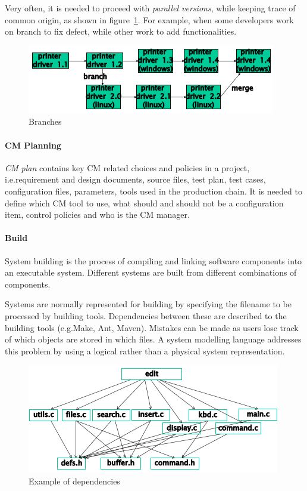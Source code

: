 Very often, it is needed to proceed with \emph{parallel versions}, while keeping trace of common origin, as shown in figure~\ref{img:branches_merges}. For example, when some developers work on branch to fix defect, while other work to add functionalities.

\begin{figure}[hbtp]
\centering
\includegraphics[scale=0.5]{images/branches_merges.png}
\caption{Branches}
\label{img:branches_merges}
\end{figure}

\paragraph{CM Planning}
\emph{CM plan} contains key CM related choices and policies in a project, i.e.\@ requirement and design documents, source files, test plan, test cases, configuration files, parameters, tools used in the production chain. It is needed to define which CM tool to use, what should and should not be a configuration item, control policies and who is the CM manager.

\paragraph{Build}
System building is the process of compiling and linking software components into an executable system. Different systems are built from different combinations of components.

Systems are normally represented for building by specifying the filename to be processed by building tools. Dependencies between these are described to the building tools (e.g.\@ Make, Ant, Maven). Mistakes can be made as users lose track of which objects are stored in which files. A system modelling language addresses this problem by using a logical rather than a physical system representation.

\begin{figure}[hbtp]
\centering
\includegraphics[scale=0.4]{images/dependencies.png}
\caption{Example of dependencies}
\end{figure}

